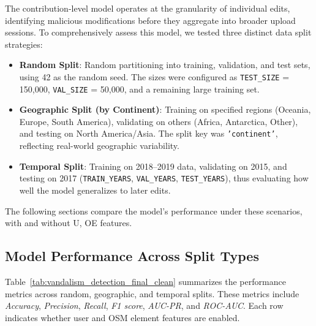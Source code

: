\documentclass[
    13pt, %
    a4paper, %
    listof=totoc, %
    bibliography=totoc, %
    index=totoc, %
    headsepline
]{scrreprt}
\begin{document}
The contribution-level model operates at the granularity of individual edits, identifying malicious modifications before they aggregate into broader upload sessions. To comprehensively assess this model, we tested three distinct data split strategies:
\begin{itemize}
    \item \textbf{Random Split}: Random partitioning into training, validation, and test sets, using 42 as the random seed. The sizes were configured as \texttt{TEST\_SIZE} = 150,000, \texttt{VAL\_SIZE} = 50,000, and a remaining large training set.
    \item \textbf{Geographic Split (by Continent)}: Training on specified regions (Oceania, Europe, South America), validating on others (Africa, Antarctica, Other), and testing on North America/Asia. The split key was \texttt{'continent'}, reflecting real-world geographic variability.
    \item \textbf{Temporal Split}: Training on 2018--2019 data, validating on 2015, and testing on 2017 (\texttt{TRAIN\_YEARS}, \texttt{VAL\_YEARS}, \texttt{TEST\_YEARS}), thus evaluating how well the model generalizes to later edits.
\end{itemize}

The following sections compare the model’s performance under these scenarios, with and without U, OE features.

\subsection{Model Performance Across Split Types}
\label{sec:split_performance}

Table~\ref{tab:vandalism_detection_final_clean} summarizes the performance metrics across random, geographic, and temporal splits. These metrics include \emph{Accuracy}, \emph{Precision}, \emph{Recall}, \emph{F1 score}, \emph{AUC-PR}, and \emph{ROC-AUC}. Each row indicates whether user and OSM element features are enabled.
\end{document}
